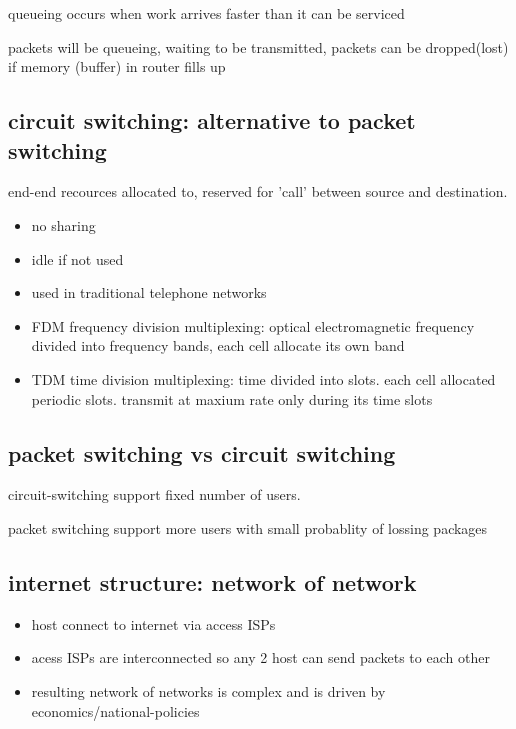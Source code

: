 \documentclass[10pt]{article}
\theoremstyle{break}
\begin{document}
queueing occurs when work arrives faster than it can be serviced

packets will be queueing, waiting to be transmitted, packets can be dropped(lost) if memory (buffer) in router fills up

\subsection{circuit switching: alternative to packet switching}
end-end recources allocated to, reserved for 'call' between source and destination. 
\begin{itemize}
    \item no sharing 
    \item idle if not used 
    \item used in traditional telephone networks
\end{itemize}

\begin{itemize}
    \item FDM frequency division multiplexing: optical electromagnetic frequency divided into frequency bands, each cell allocate its own band 
    \item TDM time division multiplexing: time divided into slots. each cell allocated periodic slots. transmit at maxium rate only during its time slots
\end{itemize}

\subsection{packet switching vs circuit switching}
circuit-switching support fixed number of users. 

packet switching support more users with small probablity of lossing packages

\subsection{internet structure: network of network}
\begin{itemize}
    \item host connect to internet via access ISPs 
    \item acess ISPs are interconnected so any 2 host can send packets to each other 
    \item resulting network of networks is complex and is driven by economics/national-policies
\end{itemize}
\end{document}
